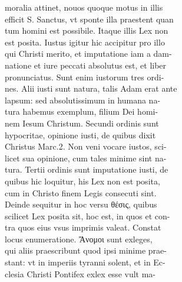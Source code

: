 \documentclass{article}
\begin{document}
\begin{pages}
                moralia attinet, nouos quoque motus in illis \\
                efficit S. Sanctus, vt sponte illa praestent quan \\
                tum homini est possibile. Itaque illis Lex non \\
                est posita. Iustus igitur hic accipitur pro illo \\
                qui Christi merito, et imputatione iam a dam- \\
                natione et iure peccati absolutus est, et liber \\
                pronunciatus. Sunt enim iustorum tres ordi- \\
                nes. Alii iusti sunt natura, talis Adam erat ante \\
                lapsum: sed absolutissimum in humana na- \\
                tura habemus exemplum, filium Dei homi- \\
                nem Iesum Christum. Secundi ordinis sunt \\
                hypocritae, opinione iusti, de quibus dixit \\
                Christus Marc.2. Non veni vocare iustos, sci- \\
                licet sua opinione, cum tales minime sint na- \\
                tura. Tertii ordinis sunt imputatione iusti, de \\
                quibus hic loquitur, his Lex non est posita, \\
                cum in Christo finem Legis consecuti sint. \\
                Deinde sequitur in hoc versu θέσις, quibus \\
                scilicet Lex posita sit, hoc est, in quos et con- \\
                tra quos eius vsus imprimis valeat. Constat \\
                locus enumeratione. Ἄνομοι sunt exleges, \\
                qui aliis praescribunt quod ipsi minime prae- \\
                stant: vt in imperiis tyranni solent, et in Ec- \\
                clesia Christi Pontifex exlex esse vult ma- \\

\end{pages}
\end{document}
